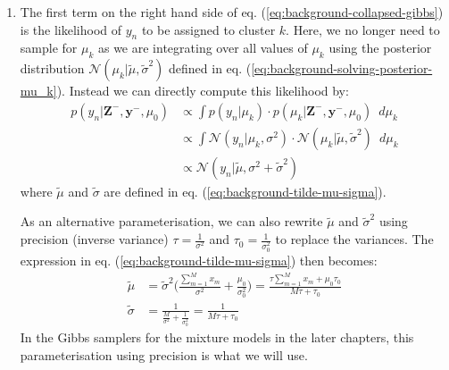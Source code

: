 \begin{enumerate}

\item The first term on the right hand side of eq. (\ref{eq:background-collapsed-gibbs}) is the likelihood of $y_n$ to be assigned to cluster $k$. Here, we no longer need to sample for $\mu_k$ as we are integrating over all values of $\mu_k$ using the posterior distribution $\mathcal{N}(\mu_k \vert \tilde{\mu}, \tilde{\sigma}^2)$ defined in eq. (\ref{eq:background-solving-posterior-mu_k}). Instead we can directly compute this likelihood by:
\begin{equation}
\begin{aligned}
p(y_n \vert \boldsymbol{Z}^{-},  \boldsymbol{y}^{-}, \mu_0) &\propto \int p(y_n \vert \mu_k) \cdot p(\mu_k \vert \boldsymbol{Z}^{-},  \boldsymbol{y}^{-}, \mu_0) \enspace d\mu_k \\
                                                                                            &\propto \int \mathcal{N}(y_n \vert \mu_k, \sigma^2) \cdot \mathcal{N}(\mu_k \vert \tilde{\mu}, \tilde{\sigma}^2) \enspace d\mu_k \\
                                                                                            &\propto \mathcal{N}(y_n \vert \tilde{\mu}, \sigma^2 + \tilde{\sigma}^2)
\end{aligned}
\label{eq:background-tilde-mu-sigma-variance}
\end{equation}
where $\tilde{\mu}$ and $\tilde{\sigma}$ are defined in eq. (\ref{eq:background-tilde-mu-sigma}). 

As an alternative parameterisation, we can also rewrite $\tilde{\mu}$ and $\tilde{\sigma}^2$ using precision (inverse variance) $\tau=\frac{1}{\sigma^2}$ and $\tau_0=\frac{1}{\sigma_0^2}$ to replace the variances. The expression in eq. (\ref{eq:background-tilde-mu-sigma}) then becomes:
\begin{equation}
\begin{aligned}
\tilde{\mu}     &= \tilde{\sigma}^2 \bigg( \frac{\sum_{m=1}^{M} x_m}{\sigma^2} + \frac{\mu_0}{\sigma_0^2} \bigg) = \frac{\tau\sum_{m=1}^{M} x_m + \mu_0\tau_0}{M\tau + \tau_0} \\
\tilde{\sigma} &= \frac{1}{\frac{M}{\sigma^2} + \frac{1}{\sigma^2_0}} = \frac{1}{M\tau + \tau_0}
\label{eq:background-tilde-mu-sigma-precision}
\end{aligned}
\end{equation}
In the Gibbs samplers for the mixture models in the later chapters, this parameterisation using precision is what we will use.


\end{enumerate}
